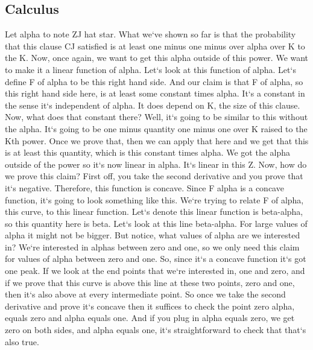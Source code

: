 \subsection{Calculus}
Let alpha to note ZJ hat star.
What we`ve shown so far is that the probability that this clause CJ satisfied is at least one minus one minus over alpha over K to the K\@.
Now, once again, we want to get this alpha outside of this power.
We want to make it a linear function of alpha.
Let`s look at this function of alpha.
Let`s define F of alpha to be this right hand side.
And our claim is that F of alpha, so this right hand side here, is at least some constant times alpha.
It`s a constant in the sense it`s independent of alpha.
It does depend on K, the size of this clause.
Now, what does that constant there? Well, it`s going to be similar to this without the alpha.
It`s going to be one minus quantity one minus one over K raised to the Kth power.
Once we prove that, then we can apply that here and we get that this is at least this quantity, which is this constant times alpha.
We got the alpha outside of the power so it`s now linear in alpha.
It`s linear in this Z\@.
Now, how do we prove this claim? First off, you take the second derivative and you prove that it`s negative.
Therefore, this function is concave.
Since F alpha is a concave function, it`s going to look something like this.
We`re trying to relate F of alpha, this curve, to this linear function.
Let`s denote this linear function is beta-alpha, so this quantity here is beta.
Let`s look at this line beta-alpha.
For large values of alpha it might not be bigger.
But notice, what values of alpha are we interested in? We`re interested in alphas between zero and one, so we only need this claim for values of alpha between zero and one.
So, since it`s a concave function it`s got one peak.
If we look at the end points that we`re interested in, one and zero, and if we prove that this curve is above this line at these two points, zero and one, then it`s also above at every intermediate point.
So once we take the second derivative and prove it`s concave then it suffices to check the point zero alpha, equals zero and alpha equals one.
And if you plug in alpha equals zero, we get zero on both sides, and alpha equals one, it`s straightforward to check that that`s also true.

